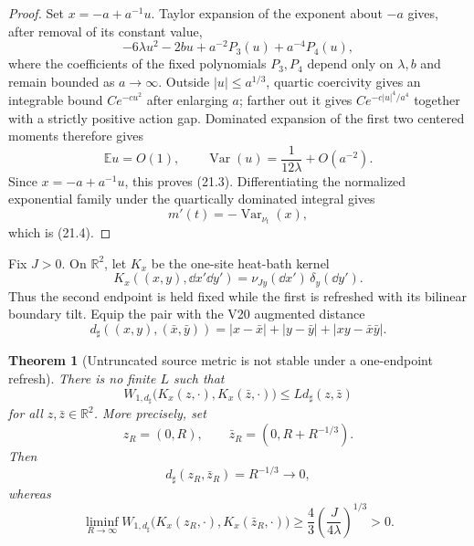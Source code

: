 \documentclass[11pt]{article}
\newtheorem{theorem}{Theorem}[section]
\theoremstyle{remark}
\begin{document}
\begin{proof}
Set \(x=-a+a^{-1}u\).  Taylor expansion of the exponent about
\(-a\) gives, after removal of its constant value,
\[
 -6\lambda u^2-2bu+
 a^{-2}P_3(u)+a^{-4}P_4(u),                                \tag{21.5}
\]
where the coefficients of the fixed polynomials \(P_3,P_4\) depend
only on \(\lambda,b\) and remain bounded as \(a\to\infty\).
Outside \(|u|\le a^{1/3}\), quartic coercivity gives an integrable
bound \(Ce^{-c u^2}\) after enlarging \(a\); farther out it gives
\(Ce^{-c|u|^4/a^4}\) together with a strictly positive action gap.
Dominated expansion of the first two centered moments therefore
gives
\[
 \mathbb E u=O(1),\qquad
 \operatorname{Var}(u)=\frac{1}{12\lambda}+O(a^{-2}).
\]
Since \(x=-a+a^{-1}u\), this proves (21.3).  Differentiating the
normalized exponential family under the quartically dominated
integral gives
\[
 m'(t)=-\operatorname{Var}_{\nu_t}(x),
\]
which is (21.4).
\end{proof}

Fix \(J>0\).  On \(\mathbb R^2\), let \(K_x\) be the one-site
heat-bath kernel
\[
 K_x((x,y),\dd x'\dd y')
 =
 \nu_{Jy}(\dd x')\,\delta_y(\dd y').                        \tag{21.6}
\]
Thus the second endpoint is held fixed while the first is refreshed
with its bilinear boundary tilt.  Equip the pair with the V20
augmented distance
\[
 d_\sharp((x,y),(\bar x,\bar y))
 =
 |x-\bar x|+|y-\bar y|+|xy-\bar x\bar y|.                   \tag{21.7}
\]

\begin{theorem}[Untruncated source metric is not stable under a
one-endpoint refresh]
\label{thm:v15v21-no-lipschitz}
There is no finite \(L\) such that
\[
 W_{1,d_\sharp}
 \bigl(K_x(z,\cdot),K_x(\bar z,\cdot)\bigr)
 \le Ld_\sharp(z,\bar z)                                    \tag{21.8}
\]
for all \(z,\bar z\in\mathbb R^2\).  More precisely, set
\[
 z_R=(0,R),\qquad
 \bar z_R=(0,R+R^{-1/3}).                                   \tag{21.9}
\]
Then
\[
 d_\sharp(z_R,\bar z_R)=R^{-1/3}\longrightarrow0,           \tag{21.10}
\]
whereas
\[
 \liminf_{R\to\infty}
 W_{1,d_\sharp}
 \bigl(K_x(z_R,\cdot),K_x(\bar z_R,\cdot)\bigr)
 \ge
 \frac43\left(\frac{J}{4\lambda}\right)^{1/3}>0.            \tag{21.11}
\]
\end{theorem}
\end{document}

